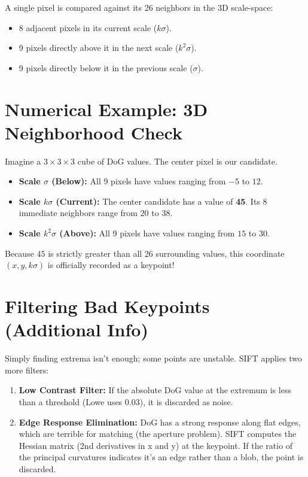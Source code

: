 \documentclass{report}
\begin{document}
A single pixel is compared against its 26 neighbors in the 3D scale-space:
\begin{itemize}
    \item 8 adjacent pixels in its current scale ($k\sigma$).
    \item 9 pixels directly above it in the next scale ($k^2\sigma$).
    \item 9 pixels directly below it in the previous scale ($\sigma$).
\end{itemize}

\section{Numerical Example: 3D Neighborhood Check}
Imagine a $3 \times 3 \times 3$ cube of DoG values. The center pixel is our candidate.
\begin{itemize}
    \item \textbf{Scale $\sigma$ (Below):} All 9 pixels have values ranging from $-5$ to $12$.
    \item \textbf{Scale $k\sigma$ (Current):} The center candidate has a value of \textbf{45}. Its 8 immediate neighbors range from $20$ to $38$.
    \item \textbf{Scale $k^2\sigma$ (Above):} All 9 pixels have values ranging from $15$ to $30$.
\end{itemize}
Because $45$ is strictly greater than all 26 surrounding values, this coordinate $(x, y, k\sigma)$ is officially recorded as a keypoint!

\section{Filtering Bad Keypoints (Additional Info)}
Simply finding extrema isn't enough; some points are unstable. SIFT applies two more filters:
\begin{enumerate}
    \item \textbf{Low Contrast Filter:} If the absolute DoG value at the extremum is less than a threshold (Lowe uses $0.03$), it is discarded as noise.
    \item \textbf{Edge Response Elimination:} DoG has a strong response along flat edges, which are terrible for matching (the aperture problem).
          SIFT computes the Hessian matrix (2nd derivatives in x and y) at the keypoint. If the ratio of the principal curvatures indicates it's
          an edge rather than a blob, the point is discarded.
\end{enumerate}
\end{document}
